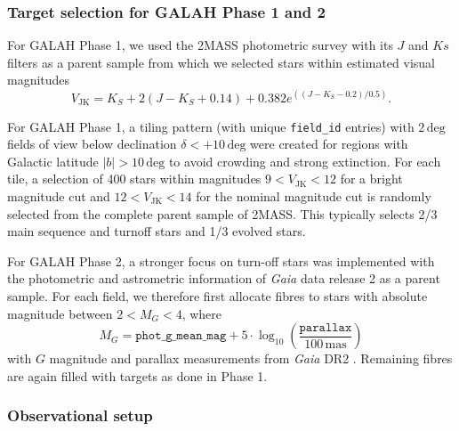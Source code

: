 \documentclass[
  journal=pasa,
  manuscript=research-paper, %
  year=2024,
  volume=37
]{cup-journal}
\newcommand{\Gaia}{\textit{Gaia}\xspace}
\begin{document}
\subsubsection{Target selection for GALAH Phase 1 and 2}

For GALAH Phase 1, we used the 2MASS photometric survey \citep{Skrutskie2006} with its $J$ and $Ks$ filters as a parent sample from which we selected stars within estimated visual magnitudes
\begin{equation}
V_\mathrm{JK} = K_S+2(J-K_S+0.14)+0.382e^{((J-K_S-0.2)/0.5)}.
\end{equation}

For GALAH Phase 1, a tiling pattern (with unique \texttt{field\_id} entries) with $2\,\mathrm{deg}$ fields of view below declination $\delta < +10\,\mathrm{deg}$ were created for regions with Galactic latitude $\vert b \vert > 10\,\mathrm{deg}$ to avoid crowding and strong extinction. For each tile, a selection of 400 stars within magnitudes $9 < V_\mathrm{JK} < 12$ for a bright magnitude cut and $12 < V_\mathrm{JK} < 14$ for the nominal magnitude cut is randomly selected from the complete parent sample of 2MASS. This typically selects 2/3 main sequence and turnoff stars and 1/3 evolved stars.

For GALAH Phase 2, a stronger focus on turn-off stars was implemented with the photometric and astrometric information of \Gaia data release 2 as a parent sample. For each field, we therefore first allocate fibres to stars with absolute magnitude between $2 < M_G < 4$, where
\begin{equation}
M_G = \texttt{phot\_g\_mean\_mag} + 5 \cdot \log_{10} \left( \frac{\texttt{parallax}}{100\,\mathrm{mas}} \right)
\end{equation}
with $G$ magnitude and parallax measurements from \Gaia DR2 \citep{Brown2018, Evans2018, Lindegren2018}. Remaining fibres are again filled with targets as done in Phase 1.

\subsubsection{Observational setup}
\end{document}
